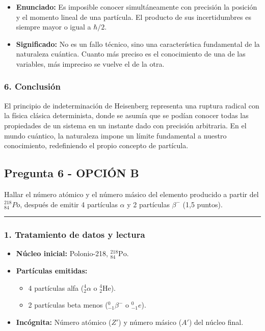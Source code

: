 \begin{cajaresultado}
\begin{itemize}
    \item \textbf{Enunciado:} Es imposible conocer simultáneamente con precisión la posición y el momento lineal de una partícula. El producto de sus incertidumbres es siempre mayor o igual a $\hbar/2$.
    \item \textbf{Significado:} No es un fallo técnico, sino una característica fundamental de la naturaleza cuántica. Cuanto más preciso es el conocimiento de una de las variables, más impreciso se vuelve el de la otra.
\end{itemize}
\end{cajaresultado}

\subsubsection*{6. Conclusión}
\begin{cajaconclusion}
El principio de indeterminación de Heisenberg representa una ruptura radical con la física clásica determinista, donde se asumía que se podían conocer todas las propiedades de un sistema en un instante dado con precisión arbitraria. En el mundo cuántico, la naturaleza impone un límite fundamental a nuestro conocimiento, redefiniendo el propio concepto de partícula.
\end{cajaconclusion}

\newpage

\subsection{Pregunta 6 - OPCIÓN B}
\label{subsec:6B_2007_sep_ext}

\begin{cajaenunciado}
Hallar el número atómico y el número másico del elemento producido a partir del ${}_{84}^{218}Po$, después de emitir 4 partículas $\alpha$ y 2 partículas $\beta^{-}$ (1,5 puntos).
\end{cajaenunciado}
\hrule

\subsubsection*{1. Tratamiento de datos y lectura}
\begin{itemize}
    \item \textbf{Núcleo inicial:} Polonio-218, ${}_{84}^{218}\text{Po}$.
    \item \textbf{Partículas emitidas:}
    \begin{itemize}
        \item 4 partículas alfa (${}_{2}^{4}\alpha$ o ${}_{2}^{4}\text{He}$).
        \item 2 partículas beta menos (${}_{-1}^{0}\beta^{-}$ o ${}_{-1}^{0}e$).
    \end{itemize}
    \item \textbf{Incógnita:} Número atómico ($Z'$) y número másico ($A'$) del núcleo final.
\end{itemize}

